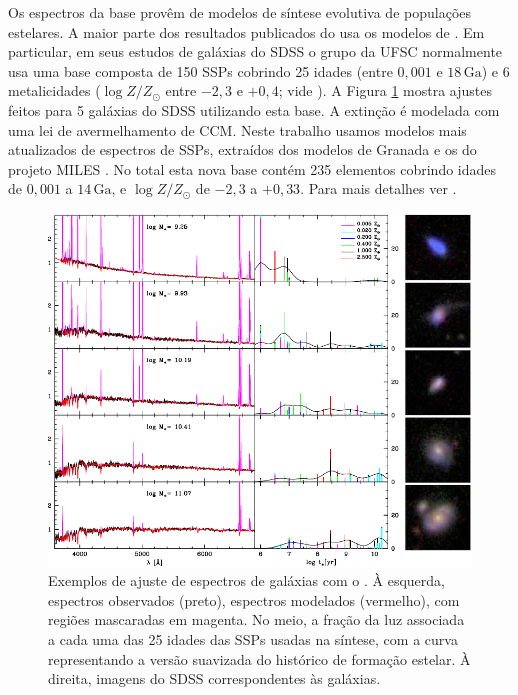 Os espectros da base provêm de modelos de síntese evolutiva de populações
estelares. A maior parte dos resultados publicados do \starlight usa os modelos
de \citet[BC03]{Bruzual2003}. Em particular, em seus estudos de galáxias do SDSS
o grupo da UFSC normalmente usa uma base composta de 150 SSPs cobrindo 25 idades
(entre $0,001$ e $18\,\mathrm{Ga}$) e 6 metalicidades ($\log Z/Z_\odot$ entre
$-2,3$ e $+0,4$; vide \citet{Mateus2006}). A Figura
\ref{fig:StarlightSpectrumSample} mostra ajustes feitos para 5 galáxias do SDSS
utilizando esta base. A extinção é modelada com uma lei de avermelhamento de
CCM. Neste trabalho usamos modelos mais atualizados de espectros de SSPs,
extraídos dos modelos de Granada \citep[para idades até
$63\,\mathrm{Ma}$]{GonzalezDelgado2005} e os do projeto MILES \citep[para idades
maiores que $63\,\mathrm{Ma}$]{Vazdekis2010}. No total esta nova base contém 235
elementos cobrindo idades de  $0,001$ a $14\,\mathrm{Ga}$, e $\log Z/Z_\odot$ de
$-2,3$ a $+0,33$.
Para mais detalhes ver \citet{GonzalezDelgado2014b, GonzalezDelgado2014a}.

\begin{figure}
	\includegraphics[width=1.0\textwidth]{figuras/starlight-fit}
	\caption[Exemplos de ajuste de espectro com o \starlight]
	{Exemplos de ajuste de espectros de galáxias com o \starlight
	\citep{Asari2007}. À esquerda, espectros observados (preto), espectros
	modelados (vermelho), com regiões mascaradas em magenta. No meio, a fração da
	luz associada a cada uma das 25 idades das SSPs usadas na síntese, com a curva
	representando a versão suavizada do histórico de formação estelar. À direita,
	imagens do SDSS correspondentes às galáxias.}
	\label{fig:StarlightSpectrumSample}
\end{figure}

